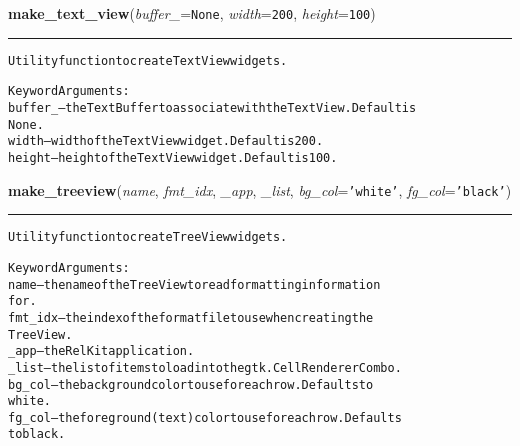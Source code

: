     \label{reliafree:widgets:make_text_view}

    \vspace{0.5ex}

\hspace{.8\funcindent}\begin{boxedminipage}{\funcwidth}

    \raggedright \textbf{make\_text\_view}(\textit{buffer\_}={\tt None}, \textit{width}={\tt 200}, \textit{height}={\tt 100})

    \vspace{-1.5ex}

    \rule{\textwidth}{0.5\fboxrule}
\setlength{\parskip}{2ex}
\begin{alltt}
Utility function to create TextView widgets.

Keyword Arguments:
buffer\_ -- the TextBuffer to associate with the TextView.  Default is
           None.
width   -- width of the TextView widget.  Default is 200.
height  -- height of the TextView widget.  Default is 100.
\end{alltt}

\setlength{\parskip}{1ex}
    \end{boxedminipage}

    \label{reliafree:widgets:make_treeview}

    \vspace{0.5ex}

\hspace{.8\funcindent}\begin{boxedminipage}{\funcwidth}

    \raggedright \textbf{make\_treeview}(\textit{name}, \textit{fmt\_idx}, \textit{\_app}, \textit{\_list}, \textit{bg\_col}={\tt \texttt{'}\texttt{white}\texttt{'}}, \textit{fg\_col}={\tt \texttt{'}\texttt{black}\texttt{'}})

    \vspace{-1.5ex}

    \rule{\textwidth}{0.5\fboxrule}
\setlength{\parskip}{2ex}
\begin{alltt}
Utility function to create TreeView widgets.

Keyword Arguments:
name    -- the name of the TreeView to read formatting information
           for.
fmt\_idx -- the index of the format file to use when creating the
           TreeView.
\_app    -- the RelKit application.
\_list   -- the list of items to load into the gtk.CellRendererCombo.
bg\_col  -- the background color to use for each row.  Defaults to
           white.
fg\_col  -- the foreground (text) color to use for each row.  Defaults
           to black.
\end{alltt}

\setlength{\parskip}{1ex}
    \end{boxedminipage}

